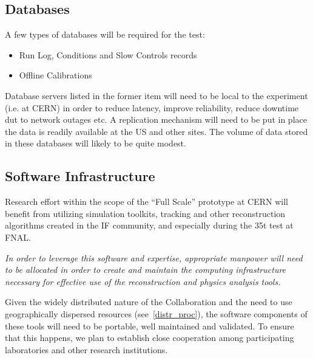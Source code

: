 

\subsection{Databases}
A few types of databases will be required for the test:
\begin{itemize}
\item Run Log, Conditions and Slow Controls records
\item Offline Calibrations
\end{itemize}

Database servers listed in the former item will need to be local to the experiment (i.e. at CERN) in order to reduce latency, improve reliability, reduce
downtime dut to network outages etc. A replication mechanism will need to be put in place the data is readily available at the US and other sites.
The volume of data stored in these databases will likely to be quite modest.


\subsection{Software Infrastructure}
Research effort within the scope of the ``Full Scale'' prototype at CERN will benefit from utilizing simulation toolkits, tracking and other reconstruction
algorithms created in the IF community, and especially during the 35t test at FNAL.

\textit{In order to leverage this
software and expertise, appropriate manpower will need to be allocated in order to create and maintain
the computing infrastructure necessary for effective use of the reconstruction and physics analysis tools.}

Given the widely distributed nature of the Collaboration and the need
to use geographically dispersed resources (see~\ref{distr_proc}),
the software components of these tools will need to be portable, well maintained and validated. To ensure that this happens,
we plan to establish close cooperation among participating laboratories and other research institutions.


